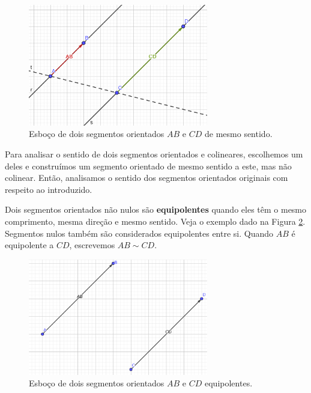 \begin{figure}[h!]
  \centering
  \includegraphics[width=0.7\textwidth]{./cap_vetor/dados/fig_segorien_sentido/fig_segorien_sentido}
  \caption{Esboço de dois segmentos orientados $AB$ e $CD$ de mesmo sentido.}
  \label{fig:segorien_sentido}
\end{figure}

Para analisar o sentido de dois segmentos orientados e colineares, escolhemos um deles e construímos um segmento orientado de mesmo sentido a este, mas não colinear. Então, analisamos o sentido dos segmentos orientados originais com respeito ao introduzido.

Dois segmentos orientados não nulos são {\bf equipolentes} quando eles têm o mesmo comprimento, mesma direção e mesmo sentido. Veja o exemplo dado na Figura \ref{fig:segequipolentes}. Segmentos nulos também são considerados equipolentes entre si. Quando $AB$ é equipolente a $CD$, escrevemos $AB \sim CD$.

\begin{figure}[h!]
  \centering
  \includegraphics[width=0.7\textwidth]{./cap_vetor/dados/fig_segequipolentes/fig_segequipolentes}
  \caption{Esboço de dois segmentos orientados $AB$ e $CD$ equipolentes.}
  \label{fig:segequipolentes}
\end{figure}

